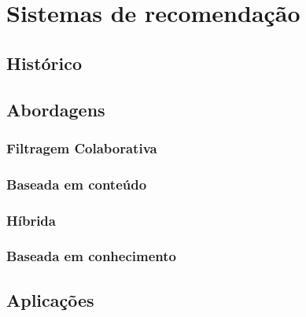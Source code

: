 \chapter{Sistemas de recomendação}
\label{cap:sistemas_de_recomendacao}



\section{Histórico}

\section{Abordagens}

    \subsection{Filtragem Colaborativa}
    
    \subsection{Baseada em conteúdo}
    
    \subsection{Híbrida}
    
    \subsection{Baseada em conhecimento}
    



\section{Aplicações}